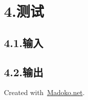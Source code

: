 \documentclass{article}
\begin{document}
\section{4.\hspace*{0.5em}测试}\label{section}%

\subsection{4.1.\hspace*{0.5em}输入}\label{section}%

\subsection{4.2.\hspace*{0.5em}输出}\label{section}%

\begin{mdbmargintb}{4em}{}%
\begin{mdflushright}%
{\tiny{}Created with~\href{https://www.madoko.net}{Madoko.net}.}%
\end{mdflushright}%
\end{mdbmargintb}%
\end{document}
